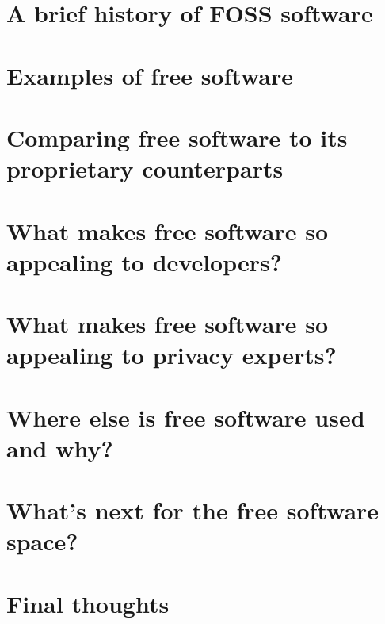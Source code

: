 \documentclass[a4paper,12pt]{article}
\begin{document}
{\section{A brief history of FOSS software}
\section{Examples of free software}
\section{Comparing free software to its proprietary counterparts}
\section{What makes free software so appealing to developers?}
\section{What makes free software so appealing to privacy experts?}
\section{Where else is free software used and why?}
\section{What's next for the free software space?}
\section{Final thoughts}

\newpage
\printbibliography
}
\end{document}
